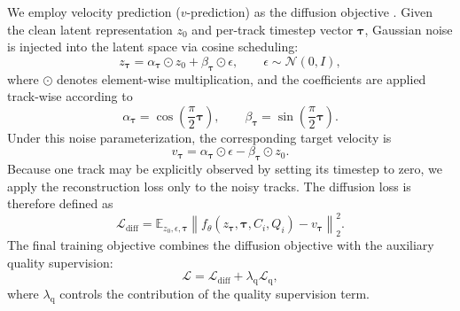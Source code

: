 \documentclass[lettersize,journal]{IEEEtran}
\begin{document}
We employ velocity prediction ($v$-prediction) as the diffusion objective \cite{salimans2022progressive}. Given the clean latent representation $z_0$ and per-track timestep vector $\boldsymbol{\tau}$, Gaussian noise is injected into the latent space via cosine scheduling:
  \begin{equation}
    z_{\boldsymbol{\tau}}=\alpha_{\boldsymbol{\tau}}\odot z_0+\beta_{\boldsymbol{\tau}}\odot\epsilon,
    \qquad
    \epsilon\sim\mathcal{N}(0,I),
  \end{equation}
where $\odot$ denotes element-wise multiplication, and the coefficients are applied track-wise according to
  \begin{equation}
    \alpha_{\boldsymbol{\tau}}=\cos\!\left(\frac{\pi}{2}\boldsymbol{\tau}\right),
    \qquad
    \beta_{\boldsymbol{\tau}}=\sin\!\left(\frac{\pi}{2}\boldsymbol{\tau}\right).
  \end{equation}
Under this noise parameterization, the corresponding target velocity is
  \begin{equation}
    v_{\boldsymbol{\tau}}
    =
    \alpha_{\boldsymbol{\tau}}\odot\epsilon
    -
    \beta_{\boldsymbol{\tau}}\odot z_0.
  \end{equation}
Because one track may be explicitly observed by setting its timestep to zero, we apply the reconstruction loss only to the noisy tracks. The diffusion loss is therefore defined as
  \begin{equation}
    \mathcal{L}_{\mathrm{diff}}
    =
    \mathbb{E}_{z_0,\epsilon,\boldsymbol{\tau}}
    \left\|
    f_{\theta}(z_{\boldsymbol{\tau}},\boldsymbol{\tau},C_i,Q_i)
    -
    v_{\boldsymbol{\tau}}
    \right\|_2^2.
  \end{equation}
The final training objective combines the diffusion objective with the auxiliary quality supervision:
  \begin{equation}
    \mathcal{L}
    =
    \mathcal{L}_{\mathrm{diff}}
    +
    \lambda_{\mathrm{q}}\mathcal{L}_{\mathrm{q}},
  \end{equation}
where $\lambda_{\mathrm{q}}$ controls the contribution of the quality supervision term.

\end{document}

